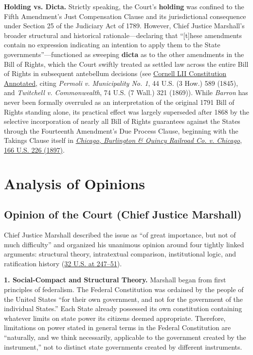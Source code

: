 \documentclass[12pt]{article}
\begin{document}
\textbf{Holding vs. Dicta.} Strictly speaking, the Court's \textbf{holding} was confined to the Fifth Amendment's Just Compensation Clause and its jurisdictional consequence under Section 25 of the Judiciary Act of 1789. However, Chief Justice Marshall's broader structural and historical rationale---declaring that ``[t]hese amendments contain no expression indicating an intention to apply them to the State governments''---functioned as sweeping \textbf{dicta} as to the other amendments in the Bill of Rights, which the Court swiftly treated as settled law across the entire Bill of Rights in subsequent antebellum decisions (see \href{https://www.law.cornell.edu/constitution-conan/amendment-14/overview-of-incorporation-of-the-bill-of-rights}{Cornell LII Constitution Annotated}, citing \textit{Permoli v. Municipality No. 1}, 44 U.S. (3 How.) 589 (1845), and \textit{Twitchell v. Commonwealth}, 74 U.S. (7 Wall.) 321 (1869)). While \textit{Barron} has never been formally overruled as an interpretation of the original 1791 Bill of Rights standing alone, its practical effect was largely superseded after 1868 by the selective incorporation of nearly all Bill of Rights guarantees against the States through the Fourteenth Amendment's Due Process Clause, beginning with the Takings Clause itself in \href{https://supreme.justia.com/cases/federal/us/166/226/}{\textit{Chicago, Burlington \& Quincy Railroad Co. v. Chicago}, 166 U.S. 226 (1897)}.

\section{Analysis of Opinions}

\subsection{Opinion of the Court (Chief Justice Marshall)}

Chief Justice Marshall described the issue as ``of great importance, but not of much difficulty'' and organized his unanimous opinion around four tightly linked arguments: structural theory, intratextual comparison, institutional logic, and ratification history (\href{https://supreme.justia.com/cases/federal/us/32/243/}{32 U.S. at 247--51}).

\textbf{1. Social-Compact and Structural Theory.} Marshall began from first principles of federalism. The Federal Constitution was ordained by the people of the United States ``for their own government, and not for the government of the individual States.'' Each State already possessed its own constitution containing whatever limits on state power its citizens deemed appropriate. Therefore, limitations on power stated in general terms in the Federal Constitution are ``naturally, and we think necessarily, applicable to the government created by the instrument,'' not to distinct state governments created by different instruments.
\end{document}

